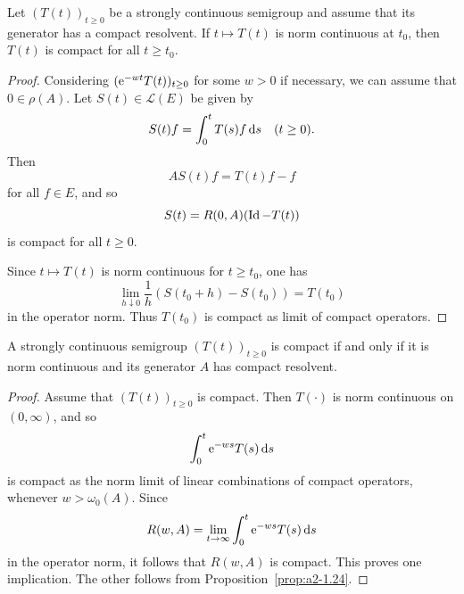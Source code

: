 \begin{proposition}\label{prop:a2-1.24}
Let $(T(t))_{t\geq 0}$ be a strongly continuous semigroup and assume that its generator has a compact resolvent.
If\/ $t \mapsto T(t)$ is norm continuous at $t_0$, then $T(t)$ is compact for all $t \geq t_0$.
\end{proposition}
\begin{proof}
Considering $(\eu^{-wt}T(t))_{t\geq 0}$ for some $w > 0$ if necessary, we can assume that $0 \in \rho(A)$.
Let $S(t) \in \mathcal{L}(E)$ be given by 
%
\[
	S(t)f = \int_0^t T(s)f \ds \quad (t \geq 0) .
\]
%
Then %
\[
	AS(t)f = T(t)f - f
\]
%
for all $f \in E$, and so 
%
\[
	S(t) = R(0,A)(\operatorname{Id}-T(t))
\]
%
is compact for all $t \geq 0$.

Since $t \mapsto T(t)$ is norm continuous for $t \geq t_0$, one has 
%
\[
	\lim_{h \downarrow 0} \frac{1}{h}(S(t_0+h)-S(t_0)) = T(t_0)
\]
%
in the operator norm.
Thus $T(t_0)$ is compact as limit of compact operators.
\end{proof}
\begin{theorem}\label{thm:a2-1.25}
A strongly continuous semigroup $(T(t))_{t\geq 0}$ is compact if and only if it is norm continuous and its generator $A$ has compact resolvent.
\end{theorem}
\begin{proof}
Assume that $(T(t))_{t\geq 0}$ is compact. Then $T(\cdot)$ is norm continuous on $(0,\infty)$, and so 
\[
    \int_{0}^{t} \mathrm{e}^{-ws} T(s) \mathop{}\!\mathrm{d}{s}
\]
is compact as the norm limit of linear combinations of compact operators, whenever $w > \omega_{0}(A)$.
Since 
\[
    R(w,A) = \lim_{t \to \infty} \int_{0}^{t} \mathrm{e}^{-ws} T(s) \mathop{}\!\mathrm{d}{s}
\]
in the operator norm, it follows that $R(w,A)$ is compact.
This proves one implication.
The other follows from Proposition~\ref{prop:a2-1.24}. 
\end{proof}
